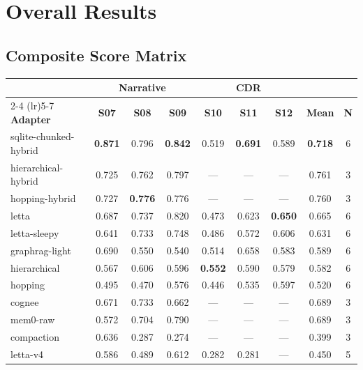 \documentclass[11pt,letterpaper]{article}
\begin{document}
\section{Overall Results}
\label{sec:results}

\subsection{Composite Score Matrix}

\begin{table}[H]
\centering
\small
\begin{tabular}{lcccccccc}
\toprule
& \multicolumn{3}{c}{\textbf{Narrative}} & \multicolumn{3}{c}{\textbf{CDR}} & & \\
\cmidrule(lr){2-4} \cmidrule(lr){5-7}
\textbf{Adapter} & \textbf{S07} & \textbf{S08} & \textbf{S09} & \textbf{S10} & \textbf{S11} & \textbf{S12} & \textbf{Mean} & \textbf{N} \\
\midrule
\rowcolor{toprow}
sqlite-chunked-hybrid & \textbf{0.871} & 0.796 & \textbf{0.842} & 0.519 & \textbf{0.691} & 0.589 & \textbf{0.718} & 6 \\
hierarchical-hybrid & 0.725 & 0.762 & 0.797 & --- & --- & --- & 0.761 & 3 \\
hopping-hybrid & 0.727 & \textbf{0.776} & 0.776 & --- & --- & --- & 0.760 & 3 \\
\addlinespace
\rowcolor{toprow}
letta & 0.687 & 0.737 & 0.820 & 0.473 & 0.623 & \textbf{0.650} & 0.665 & 6 \\
letta-sleepy & 0.641 & 0.733 & 0.748 & 0.486 & 0.572 & 0.606 & 0.631 & 6 \\
\addlinespace
graphrag-light & 0.690 & 0.550 & 0.540 & 0.514 & 0.658 & 0.583 & 0.589 & 6 \\
hierarchical & 0.567 & 0.606 & 0.596 & \textbf{0.552} & 0.590 & 0.579 & 0.582 & 6 \\
hopping & 0.495 & 0.470 & 0.576 & 0.446 & 0.535 & 0.597 & 0.520 & 6 \\
\addlinespace
cognee & 0.671 & 0.733 & 0.662 & --- & --- & --- & 0.689 & 3 \\
mem0-raw & 0.572 & 0.704 & 0.790 & --- & --- & --- & 0.689 & 3 \\
compaction & 0.636 & 0.287 & 0.274 & --- & --- & --- & 0.399 & 3 \\
\addlinespace
letta-v4 & 0.586 & 0.489 & 0.612 & 0.282 & 0.281 & --- & 0.450 & 5 \\

\end{tabular}
\end{table}
\end{document}
